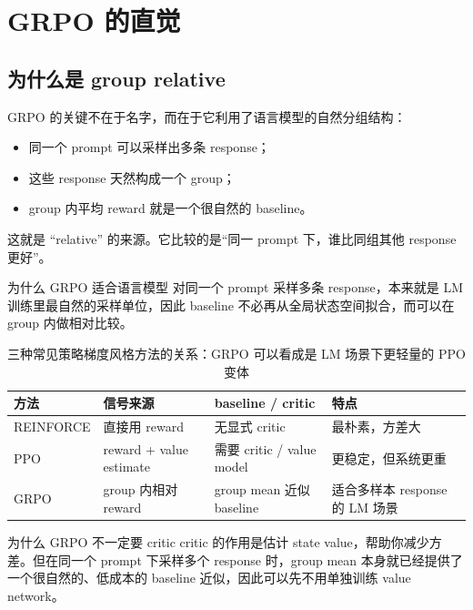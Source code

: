 \section{GRPO 的直觉}

\subsection{为什么是 group relative}

GRPO 的关键不在于名字，而在于它利用了语言模型的自然分组结构：
\begin{itemize}
    \item 同一个 prompt 可以采样出多条 response；
    \item 这些 response 天然构成一个 group；
    \item group 内平均 reward 就是一个很自然的 baseline。
\end{itemize}

这就是 “relative” 的来源。它比较的是“同一 prompt 下，谁比同组其他 response 更好”。

\begin{knowledgebox}{为什么 GRPO 适合语言模型}
对同一个 prompt 采样多条 response，本来就是 LM 训练里最自然的采样单位，因此 baseline 不必再从全局状态空间拟合，而可以在 group 内做相对比较。
\end{knowledgebox}

\begin{table}[H]
\centering
\begin{tabular}{@{}p{2.4cm}p{3.8cm}p{3.6cm}p{3.5cm}@{}}
\toprule
\textbf{方法} & \textbf{信号来源} & \textbf{baseline / critic} & \textbf{特点} \\
\midrule
REINFORCE & 直接用 reward & 无显式 critic & 最朴素，方差大 \\
PPO & reward + value estimate & 需要 critic / value model & 更稳定，但系统更重 \\
GRPO & group 内相对 reward & group mean 近似 baseline & 适合多样本 response 的 LM 场景 \\
\bottomrule
\end{tabular}
\caption{三种常见策略梯度风格方法的关系：GRPO 可以看成是 LM 场景下更轻量的 PPO 变体}
\end{table}

\begin{knowledgebox}{为什么 GRPO 不一定要 critic}
critic 的作用是估计 state value，帮助你减少方差。但在同一个 prompt 下采样多个 response 时，group mean 本身就已经提供了一个很自然的、低成本的 baseline 近似，因此可以先不用单独训练 value network。
\end{knowledgebox}



